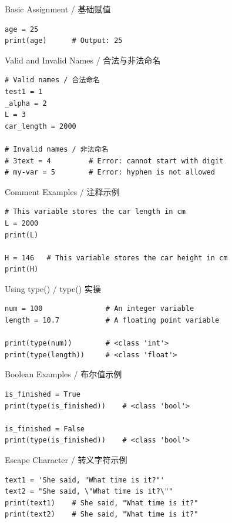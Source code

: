 \documentclass[11pt,a4paper]{report}
\begin{document}
\tableofcontents
\newpage

\begin{examplebox}{Basic Assignment / 基础赋值}
\begin{lstlisting}
age = 25
print(age)      # Output: 25
\end{lstlisting}
\end{examplebox}

\begin{examplebox}{Valid and Invalid Names / 合法与非法命名}
\begin{lstlisting}
# Valid names / 合法命名
test1 = 1
_alpha = 2
L = 3
car_length = 2000

# Invalid names / 非法命名
# 3text = 4         # Error: cannot start with digit
# my-var = 5        # Error: hyphen is not allowed
\end{lstlisting}
\end{examplebox}

\begin{examplebox}{Comment Examples / 注释示例}
\begin{lstlisting}
# This variable stores the car length in cm
L = 2000
print(L)

H = 146   # This variable stores the car height in cm
print(H)
\end{lstlisting}
\end{examplebox}

\begin{examplebox}{Using type() / type() 实操}
\begin{lstlisting}
num = 100               # An integer variable
length = 10.7           # A floating point variable

print(type(num))        # <class 'int'>
print(type(length))     # <class 'float'>
\end{lstlisting}
\end{examplebox}

\begin{examplebox}{Boolean Examples / 布尔值示例}
\begin{lstlisting}
is_finished = True
print(type(is_finished))    # <class 'bool'>

is_finished = False
print(type(is_finished))    # <class 'bool'>
\end{lstlisting}
\end{examplebox}

\begin{examplebox}{Escape Character / 转义字符示例}
\begin{lstlisting}
text1 = 'She said, "What time is it?"'
text2 = "She said, \"What time is it?\""
print(text1)    # She said, "What time is it?"
print(text2)    # She said, "What time is it?"
\end{lstlisting}
\end{examplebox}
\end{document}
